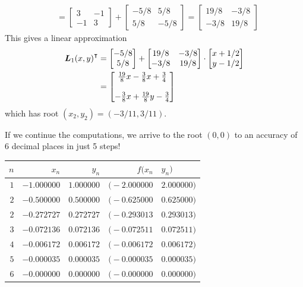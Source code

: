 \begin{example}
\begin{align*}
&= \begin{bmatrix} 3 & -1 \\ -1 & 3 \end{bmatrix} + \begin{bmatrix} -5/8 & 5/8 \\ 5/8 & -5/8 \end{bmatrix} = \begin{bmatrix} 19/8 & -3/8 \\ -3/8 & 19/8 \end{bmatrix}
\end{align*}
This gives a linear approximation 
\begin{align*}
{\boldsymbol{L}_1(x,y)}^\intercal &= \begin{bmatrix} -5/8 \\ 5/8 \end{bmatrix} + \begin{bmatrix} 19/8 & -3/8 \\ -3/8 & 19/8 \end{bmatrix} \cdot \begin{bmatrix} x + 1/2 \\ y - 1/2 \end{bmatrix} \\
&= \begin{bmatrix} \tfrac{19}{8}x-\tfrac{3}{8}x + \tfrac{3}{4} \\ \\ -\tfrac{3}{8}x+\tfrac{19}{8}y - \tfrac{3}{4} \end{bmatrix}
\end{align*}
which has root $(x_2, y_2) = (-3/11, 3/11)$.

If we continue the computations, we arrive to the root $(0,0)$ to an accuracy of 6 decimal places in just 5 steps!
\begin{center}
\begin{tabular}{|r|r|r|r@{, }l|} \hline 
$n$ & $x_n$ & $y_n$ & $f(x_n$ & $y_n)$ \\ \hline \hline 
$1$ & $-1.000000$ & $1.000000$ & $\big(-2.000000$ & $2.000000 \big)$ \\ \hline 
$2$ & $-0.500000$ & $0.500000$ & $\big(-0.625000$ & $0.625000 \big)$ \\ \hline 
$2$ & $-0.272727$ & $0.272727$ & $\big(-0.293013$ & $0.293013 \big)$ \\ \hline 
$3$ & $-0.072136$ & $0.072136$ & $\big(-0.072511$ & $0.072511 \big)$ \\ \hline 
$4$ & $-0.006172$ & $0.006172$ & $\big(-0.006172$ & $0.006172 \big)$ \\ \hline 
$5$ & $-0.000035$ & $0.000035$ & $\big(-0.000035$ & $0.000035 \big)$ \\ \hline 
$6$ & $-0.000000$ & $0.000000$ & $\big(-0.000000$ & $0.000000 \big)$ \\ \hline 
\end{tabular}
\end{center}
\end{example}

